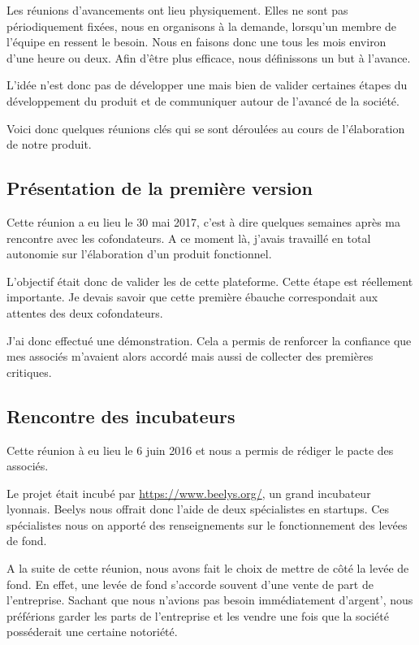 \documentclass[]{report}
\begin{document}
    Les réunions d'avancements ont lieu physiquement. Elles ne sont pas périodiquement fixées, nous en organisons à la demande, lorsqu'un membre de l'équipe en ressent le besoin. Nous en faisons donc une tous les mois environ d'une heure ou deux. Afin d'être plus efficace, nous définissons un but à l'avance.

    L'idée n'est donc pas de développer une  mais bien de valider certaines étapes du développement du produit et de communiquer autour de l'avancé de la société.

    Voici donc quelques réunions clés qui se sont déroulées au cours de l'élaboration de notre produit.

    \subsection{Présentation de la première version}

      Cette réunion a eu lieu le 30 mai 2017, c'est à dire quelques semaines après ma rencontre avec les cofondateurs. A ce moment là, j'avais travaillé en total autonomie sur l'élaboration d'un produit fonctionnel.

      L'objectif était donc de valider les  de cette plateforme. Cette étape est réellement importante. Je devais savoir que cette première ébauche correspondait aux attentes des deux cofondateurs.

      J'ai donc effectué une démonstration. Cela a permis de renforcer la confiance que mes associés m'avaient alors accordé mais aussi de collecter des premières critiques.

    \subsection{Rencontre des incubateurs}

      Cette réunion à eu lieu le 6 juin 2016 et nous a permis de rédiger le pacte des associés.

      Le projet était incubé par \href{Beelys}{https://www.beelys.org/}, un grand incubateur lyonnais. Beelys nous offrait donc l'aide de deux spécialistes en startups. Ces spécialistes nous on apporté des renseignements sur le fonctionnement des levées de fond.

      A la suite de cette réunion, nous avons fait le choix de mettre de côté la levée de fond. En effet, une levée de fond s'accorde souvent d'une vente de part de l'entreprise. Sachant que nous n'avions pas besoin immédiatement d'argent', nous préférions garder les parts de l'entreprise et les vendre une fois que la société posséderait une certaine notoriété.
\end{document}
